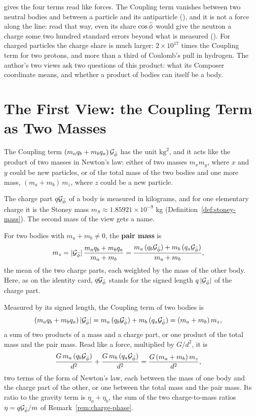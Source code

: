  gives the four terms read like forces. The Coupling term vanishes between two neutral bodies and between a particle and its antiparticle (), and it is not a force along the line: read that way, even its share $\cos\bar{\phi}$ would give the neutron a charge some two hundred standard errors beyond what is measured (). For charged particles the charge share is much larger: $2 \times 10^{17}$ times the Coupling term for two protons, and more than a third of Coulomb's pull in hydrogen. The author's two views ask two questions of this product: what its Composer coordinate means, and whether a product of bodies can itself be a body.

\section{The First View: the Coupling Term as Two Masses}\label{sec:op-first}

\begin{view}\label{view:op-masses}
The Coupling term $(m_a q_b + m_b q_a)\,\mathcal{G}_{\bar{\phi}}$ has the unit $\mathrm{kg}^2$, and it acts like the product of two masses in Newton's law: either of two masses $m_x m_y$, where $x$ and $y$ could be new particles, or of the total mass of the two bodies and one more mass, $(m_a + m_b)\,m_z$, where $z$ could be a new particle.
\end{view}

The charge part $q\mathcal{G}_{\bar{\phi}}$ of a body is measured in kilograms, and for one elementary charge it is the Stoney mass $m_S \approx 1.85921 \times 10^{-9}$ kg (Definition~\ref{def:stoney-mass}). The second mass of the view gets a name.

\begin{definition}\label{def:op-pair-mass}
For two bodies with $m_a + m_b \neq 0$, the \textbf{pair mass} is
\[
m_z = |\mathcal{G}_{\bar{\phi}}|\,\frac{m_a q_b + m_b q_a}{m_a + m_b} = \frac{m_a\,(q_b\mathcal{G}_{\bar{\phi}}) + m_b\,(q_a\mathcal{G}_{\bar{\phi}})}{m_a + m_b} ,
\]
the mean of the two charge parts, each weighted by the mass of the other body. Here, as on the identity card, $q\mathcal{G}_{\bar{\phi}}$ stands for the signed length $q\,|\mathcal{G}_{\bar{\phi}}|$ of the charge part.
\end{definition}

\begin{proposition}\label{prop:op-pairs}
Measured by its signed length, the Coupling term of two bodies is
\[
(m_a q_b + m_b q_a)\,|\mathcal{G}_{\bar{\phi}}| = m_a\,(q_b\mathcal{G}_{\bar{\phi}}) + m_b\,(q_a\mathcal{G}_{\bar{\phi}}) = (m_a + m_b)\,m_z ,
\]
a sum of two products of a mass and a charge part, or one product of the total mass and the pair mass. Read like a force, multiplied by $G/d^2$, it is
\[
\frac{G\,m_a\,(q_b\mathcal{G}_{\bar{\phi}})}{d^2} + \frac{G\,m_b\,(q_a\mathcal{G}_{\bar{\phi}})}{d^2} = \frac{G\,(m_a + m_b)\,m_z}{d^2} ,
\]
two terms of the form of Newton's law, each between the mass of one body and the charge part of the other, or one between the total mass and the pair mass. Its ratio to the gravity term is $\eta_a + \eta_b$, the sum of the two charge-to-mass ratios $\eta = q\mathcal{G}_{\bar{\phi}}/m$ of Remark~\ref{rem:charge-phase}.
\end{proposition}

